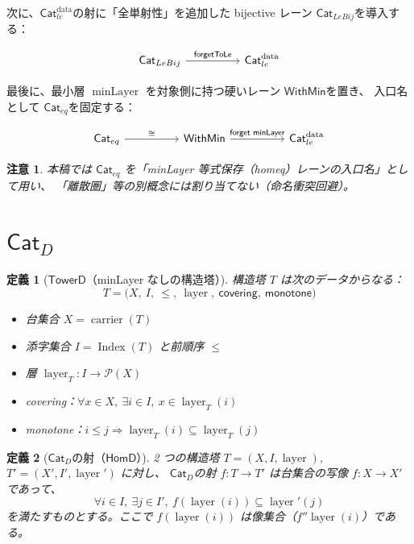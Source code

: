 \documentclass[a4paper,12pt]{ltjsarticle}
\newtheorem{definition}{定義}[section]
\newtheorem{remark}{注意}[section]
\newcommand{\TowerD}{\ensuremath{\mathsf{TowerD}}}
\newcommand{\HomD}{\ensuremath{\mathsf{HomD}}}
\newcommand{\CatD}{\ensuremath{\mathsf{Cat}_D}}
\newcommand{\Catledata}{\ensuremath{\mathsf{Cat}_{le}^{\text{data}}}}
\newcommand{\CatLeBij}{\ensuremath{\mathsf{Cat}_{LeBij}}}
\newcommand{\WithMin}{\ensuremath{\mathsf{WithMin}}}
\newcommand{\Cateq}{\ensuremath{\mathsf{Cat}_{eq}}}
\newcommand{\minLayer}{\operatorname{minLayer}}
\newcommand{\layer}{\operatorname{layer}}
\newcommand{\Index}{\operatorname{Index}}
\newcommand{\carrier}{\operatorname{carrier}}
\begin{document}
次に、\Catledata の射に「全単射性」を追加した bijective レーン \CatLeBij を導入する：

\[
\begin{tikzcd}[column sep=huge]
  \CatLeBij \arrow[r, "\textsf{forgetToLe}"] &
  \Catledata
\end{tikzcd}
\]

最後に、最小層 \(\minLayer\) を対象側に持つ硬いレーン \WithMin を置き、
入口名として \Cateq を固定する：

\[
\begin{tikzcd}[column sep=huge]
  \Cateq \arrow[r, "\cong"] &
  \WithMin \arrow[r, "\textsf{forget minLayer}"] &
  \Catledata
\end{tikzcd}
\]

\begin{remark}
本稿では \(\Cateq\) を「minLayer 等式保存（homeq）レーンの入口名」として用い、
「離散圏」等の別概念には割り当てない（命名衝突回避）。
\end{remark}

\section{\CatD}

\begin{definition}[\TowerD（minLayer なしの構造塔）]
構造塔 \(T\) は次のデータからなる：
\[
T = \bigl(X,\ I,\ \le,\ \layer,\ \textsf{covering},\ \textsf{monotone}\bigr)
\]
\begin{itemize}
  \item 台集合 \(X=\carrier(T)\)
  \item 添字集合 \(I=\Index(T)\) と前順序 \(\le\)
  \item 層 \(\layer_T : I \to \mathcal{P}(X)\)
  \item covering：\(\forall x\in X,\ \exists i\in I,\ x\in \layer_T(i)\)
  \item monotone：\(i\le j \Rightarrow \layer_T(i)\subseteq \layer_T(j)\)
\end{itemize}
\end{definition}

\begin{definition}[\CatD の射（\HomD）]
2 つの構造塔 \(T=(X,I,\layer)\), \(T'=(X',I',\layer')\) に対し、
\CatD の射 \(f:T\to T'\) は台集合の写像 \(f:X\to X'\) であって、
\[
\forall i\in I,\ \exists j\in I',\ f(\layer(i))\subseteq \layer'(j)
\]
を満たすものとする。ここで \(f(\layer(i))\) は像集合（\(f''\layer(i)\)）である。
\end{definition}
\end{document}
